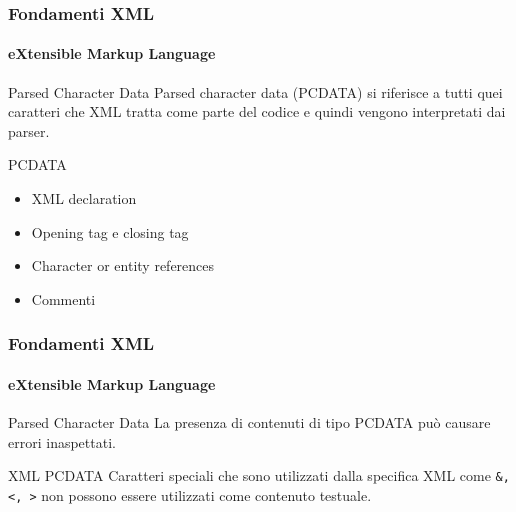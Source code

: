 \begin{frame}
    \frametitle{Fondamenti XML}
    \framesubtitle{eXtensible Markup Language}
    \addtocounter{nframe}{1}

	\begin{block}{Parsed Character Data}
		Parsed character data (PCDATA) si riferisce a tutti quei caratteri che XML tratta come parte del codice e quindi vengono interpretati dai parser.
	\end{block}

	\begin{block}{PCDATA}
		\begin{itemize}
			\item XML declaration
			\item Opening tag e  closing tag
			\item Character or entity references
			\item Commenti
		\end{itemize}
	\end{block}

\end{frame}


\begin{frame}
    \frametitle{Fondamenti XML}
    \framesubtitle{eXtensible Markup Language}
    \addtocounter{nframe}{1}

	\begin{block}{Parsed Character Data}
		La presenza di contenuti di tipo PCDATA può causare errori inaspettati.
	\end{block}

	\begin{block}{XML PCDATA}
		Caratteri speciali che sono utilizzati dalla specifica XML come \texttt{\&, <, >} non possono essere utilizzati come contenuto testuale.
	\end{block}

\end{frame}



